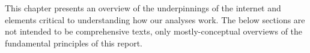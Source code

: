 This chapter presents an overview of the underpinnings of the internet and elements critical to understanding how our analyses work. The below sections are not intended to be comprehensive texts, only mostly-conceptual overviews of the fundamental principles of this report.
